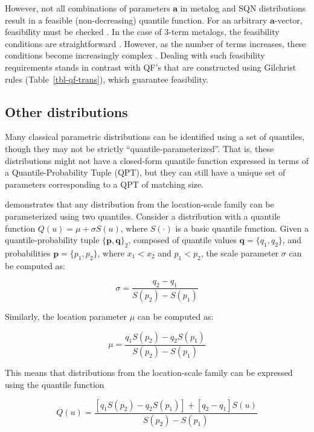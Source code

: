 \documentclass[
  fleqn,
  deca,
  blindrev
]{informs4}
\begin{document}
However, not all combinations of parameters \(\mathbf{a}\) in metalog
and SQN distributions result in a feasible (non-decreasing) quantile
function. For an arbitrary \(\mathbf{a}\)-vector, feasibility must be
checked \citep{keelin2011QuantileParameterizedDistributions}. In the
case of 3-term metalogs, the feasibility conditions are straightforward
\citep{keelin2016MetalogDistributions}. However, as the number of terms
increases, these conditions become increasingly complex
\citep{keelin2017MetalogDistributionsFeasibility}. Dealing with such
feasibility requirements stands in contrast with QF's that are
constructed using Gilchrist rules (Table~\ref{tbl-qf-trans}), which
guarantee feasibility.

\subsection{Other distributions}\label{other-distributions}

\textcolor[HTML]{ff0000}{Many classical parametric distributions can be
identified using a set of quantiles, though they may not be strictly
``quantile-parameterized''. That is, these distributions might not have
a closed-form quantile function expressed in terms of a
Quantile-Probability Tuple (QPT), but they can still have a unique set
of parameters corresponding to a QPT of matching size.}

\textcolor[HTML]{ff0000}{\citet{cook2010DeterminingDistributionParameters}
demonstrates that any distribution from the location-scale family can be
parameterized using two quantiles. Consider a distribution with a
quantile function \(Q(u)=\mu + \sigma S(u)\), where \(S(\cdot)\) is a
basic quantile function. Given a quantile-probability tuple
\(\{\mathbf{p},\mathbf{q} \}_2\), composed of quantile values
\(\mathbf{q}=\{q_1, q_2\}\), and probabilities
\({\mathbf{p}=\{p_1, p_2\}}\), where \(x_1<x_2\) and \(p_1<p_2\), the
scale parameter \(\sigma\) can be computed as:}

\[
\sigma=\frac{q_2-q_1}{S(p_2)-S(p_1)}
\]

\textcolor[HTML]{ff0000}{Similarly, the location parameter \(\mu\) can
be computed as:}

\[
\mu=\frac{q_1S(p_2)-q_2S(p_1)}{S(p_2)-S(p_1)}
\]

\textcolor[HTML]{ff0000}{This means that distributions from the
location-scale family can be expressed using the quantile function}

\[
Q(u)=\frac{[q_1S(p_2)-q_2S(p_1)]+[q_2-q_1]S(u)}{S(p_2)-S(p_1)}
\]
\end{document}
